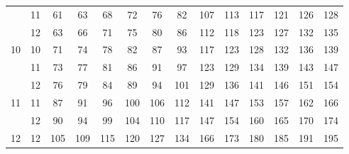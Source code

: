 \begin{center}
\begin{tabular}[t]{|c|c|*{6}{c}|*{6}{c}|}
     & 11 &  61 &  63 &  68 &  72 &  76 &  82 & 107 & 113 & 117 & 121 & 126 & 128 \\
     & 12 &  63 &  66 &  71 &  75 &  80 &  86 & 112 & 118 & 123 & 127 & 132 & 135 \\
  \hline
  10 & 10 &  71 &  74 &  78 &  82 &  87 &  93 & 117 & 123 & 128 & 132 & 136 & 139 \\
     & 11 &  73 &  77 &  81 &  86 &  91 &  97 & 123 & 129 & 134 & 139 & 143 & 147 \\
     & 12 &  76 &  79 &  84 &  89 &  94 & 101 & 129 & 136 & 141 & 146 & 151 & 154 \\
  \hline
  11 & 11 &  87 &  91 &  96 & 100 & 106 & 112 & 141 & 147 & 153 & 157 & 162 & 166 \\
     & 12 &  90 &  94 &  99 & 104 & 110 & 117 & 147 & 154 & 160 & 165 & 170 & 174 \\
  \hline
  12 & 12 & 105 & 109 & 115 & 120 & 127 & 134 & 166 & 173 & 180 & 185 & 191 & 195 \\
  \hline
  \end{tabular}

\end{center}

